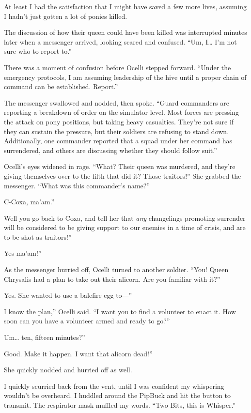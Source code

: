 At least I had the satisfaction that I might have saved a few more lives, assuming I hadn’t just gotten a lot of ponies killed.

The discussion of how their queen could have been killed was interrupted minutes later when a messenger arrived, looking scared and confused. “Um, I… I’m not sure who to report to.”

There was a moment of confusion before Ocelli stepped forward. “Under the emergency protocols, I am assuming leadership of the hive until a proper chain of command can be established. Report.”

The messenger swallowed and nodded, then spoke. “Guard commanders are reporting a breakdown of order on the simulator level. Most forces are pressing the attack on pony positions, but taking heavy casualties. They’re not sure if they can sustain the pressure, but their soldiers are refusing to stand down. Additionally, one commander reported that a squad under her command has surrendered, and others are discussing whether they should follow suit.”

Ocelli’s eyes widened in rage. “What? Their queen was murdered, and they’re giving themselves over to the filth that did it? Those traitors!” She grabbed the messenger. “What was this commander’s name?”

\leavevmode{}C-Coxa, ma’am.”

\leavevmode{}Well you go back to Coxa, and tell her that \textit{any} changelings promoting surrender will be considered to be giving support to our enemies in a time of crisis, and are to be shot as traitors!”

\leavevmode{}Yes ma’am!”

As the messenger hurried off, Ocelli turned to another soldier. “You! Queen Chrysalis had a plan to take out their alicorn. Are you familiar with it?”

\leavevmode{}Yes. She wanted to use a balefire egg to—”

\leavevmode{}I know the plan,” Ocelli said. “I want you to find a volunteer to enact it. How soon can you have a volunteer armed and ready to go?”

\leavevmode{}Um… ten, fifteen minutes?”

\leavevmode{}Good. Make it happen. I want that alicorn dead!”

She quickly nodded and hurried off as well.

I quickly scurried back from the vent, until I was confident my whispering wouldn’t be overheard. I huddled around the PipBuck and hit the button to transmit. The respirator mask muffled my words. “Two Bits, this is Whisper.”

